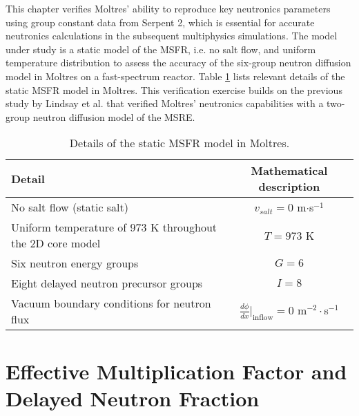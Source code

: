 This chapter verifies Moltres' ability to reproduce key neutronics parameters
using group constant data from Serpent 2, which is essential for accurate
neutronics calculations in the subsequent multiphysics simulations. The model
under study is a static model of the \gls{MSFR}, i.e. no salt flow, and
uniform temperature distribution to assess the accuracy of the
six-group neutron diffusion model in Moltres on a fast-spectrum reactor. Table
\ref{table:static} lists relevant details of the static \gls{MSFR} model
in Moltres. This
verification exercise builds on the previous study by Lindsay et al.
\cite{lindsay_introduction_2018} that verified Moltres' neutronics
capabilities with a two-group neutron diffusion model of the \gls{MSRE}.

\begin{table}[htbp!]
    \small
	\caption{Details of the static \gls{MSFR} model in Moltres.}
	\centering
	\begin{tabular}{ l c}
		\toprule
		Detail & Mathematical description \\
        \midrule
        No salt flow (static salt) & $v_{salt} = 0$ m$\cdot$s$^{-1}$ \\
        Uniform temperature of 973 K throughout the 2D core model & $T = 973$
        K \\
        Six neutron energy groups & $G = 6$ \\
        Eight delayed neutron precursor groups & $I = 8$ \\
        Vacuum boundary conditions for neutron flux &
        $\frac{d \phi}{dx}\big|_{\text{inflow}} = 0$ m$^{-2}\cdot$s$^{-1}$ \\
		\bottomrule
	\end{tabular}
	\label{table:static}
\end{table}

\section{Effective Multiplication Factor and Delayed Neutron Fraction}

